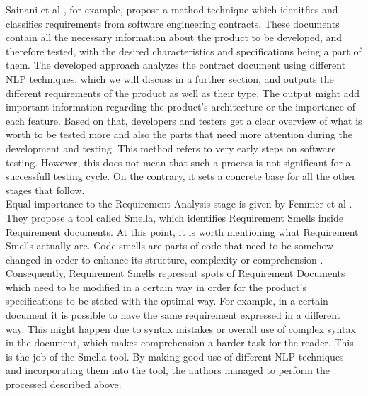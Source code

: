 Sainani et al \cite{reqclass}, for example, propose a method technique which idenitfies and classifies requirements from software engineering contracts. These documents contain all 
the necessary information about the product to be developed, and therefore tested, with the desired characteristics and specifications being a part of them. The developed approach 
analyzes the contract document using different NLP techniques, which we will discuss in a further section, and outputs the different requirements of the product as well as their type. 
The output might add important information regarding the product's architecture or the importance of each feature. Based on that, developers and testers get a clear overview of what 
is worth to be tested more and also the parts that need more attention during the development and testing. This method refers to very early steps on software testing. However, 
this does not mean that such a process is not significant for a successfull testing cycle. On the contrary, it sets a concrete base for all the other stages that follow. \\

Equal importance to the Requirement Analysis stage is given by Femmer et al \cite{femmer2017rapid}. They propose a tool called Smella, which identifies Requirement Smells inside 
Requirement documents. At this point, it is worth mentioning what Requirement Smells actually are. Code smells are parts of code that need to be somehow changed in order to enhance 
its structure, complexity or comprehension \cite{fowler2018refactoring}. Consequently, Requirement Smells represent spots of Requirement Documents which need to be modified in a 
certain way in order for the product's specifications to be stated with the optimal way. For example, in a certain document it is possible to have the same requirement expressed in 
a different way. This might happen due to syntax mistakes or overall use of complex syntax in the document, which makes comprehension a harder task for the reader. This is 
the job of the Smella tool. By making good use of different NLP techniques and incorporating them into the tool, the authors managed to perform the processed described above. \\


